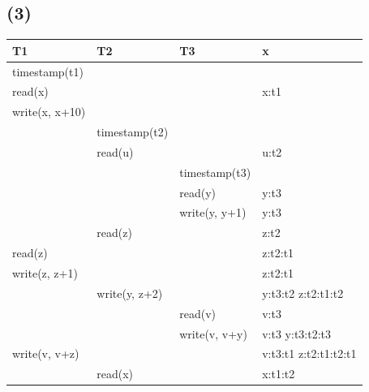 \documentclass[12pt]{article}%
\begin{document}
\clearpage
\subsection*{(3)}
\begin{table}[h]
    \centering
    \begin{tabular}{llll}
    \hline
    T1             & T2            & T3            & x                     \\ \hline
    timestamp(t1)  &               &               &                       \\
    read(x)        &               &               & x:t1                  \\
    write(x, x+10) &               &               &                       \\
                   & timestamp(t2) &               &                       \\
                   & read(u)       &               & u:t2                  \\
                   &               & timestamp(t3) &                       \\
                   &               & read(y)       & y:t3                  \\
                   &               & write(y, y+1) & y:t3                  \\
                   & read(z)       &               & z:t2                  \\
    read(z)        &               &               & z:t2:t1               \\
    write(z, z+1)  &               &               & z:t2:t1               \\
                   & write(y, z+2) &               & y:t3:t2 z:t2:t1:t2    \\
                   &               & read(v)       & v:t3                  \\
                   &               & write(v, v+y) & v:t3 y:t3:t2:t3       \\
    write(v, v+z)  &               &               & v:t3:t1 z:t2:t1:t2:t1 \\
                   & read(x)       &               & x:t1:t2               \\ \hline
    \end{tabular}
    \end{table}
\end{document}
